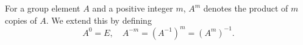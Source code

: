 For a group element $A$ and a positive integer $m$, $A^m$ denotes the product of $m$ copies of $A$. We extend this by defining
$$A^0 = E, \quad A^{-m} = (A^{-1})^m = (A^m)^{-1}.$$
